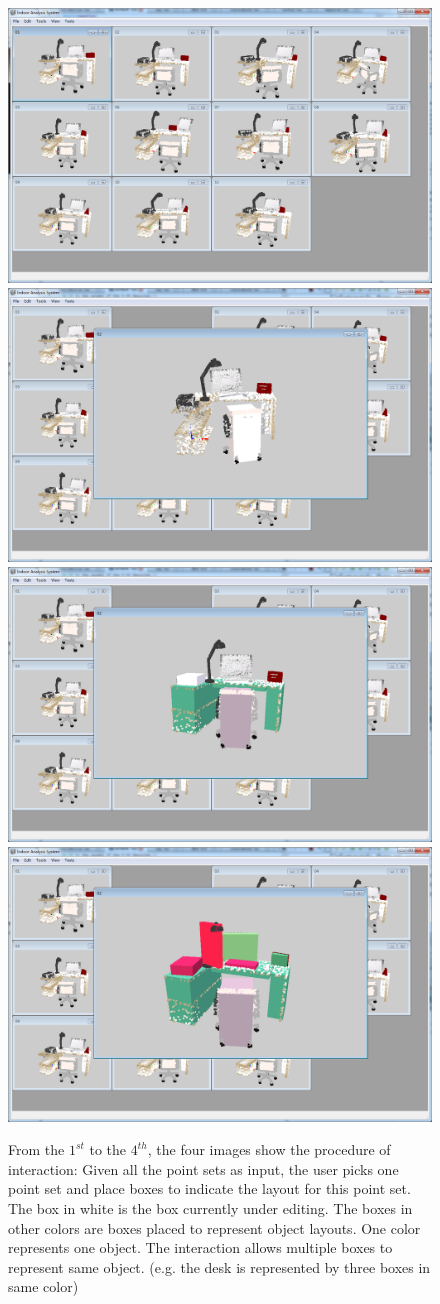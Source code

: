 \begin{figure}
	\centering
	\includegraphics[width=.45\linewidth]{images/interact01.png}
	\includegraphics[width=.45\linewidth]{images/interact02.png}
	\includegraphics[width=.45\linewidth]{images/interact03.png}
	\includegraphics[width=.45\linewidth]{images/interact06.png}
	\caption{\label{fig:interact}
		From the $1^{st}$ to the $4^{th}$, the four images show the procedure of interaction:
		Given all the point sets as input, the user picks one point set and place boxes to indicate the layout for this point set. The box in white is the box currently under editing. The boxes in other colors are boxes placed to represent object layouts. One color represents one object. The interaction allows multiple boxes to represent same object. (e.g. the desk is represented by three boxes in same color)}
\end{figure}


